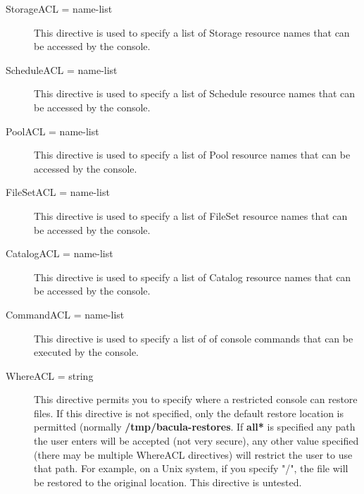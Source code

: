 \begin{description}
\item [StorageACL = \lt{}name-list\gt{}]
   This directive is used to  specify a list of Storage resource names that can
be accessed by  the console.  

\item [ScheduleACL = \lt{}name-list\gt{}]
   This directive is used to  specify a list of Schedule resource names that can
   be accessed by the console.

\item [PoolACL = \lt{}name-list\gt{}]
   This directive is used to  specify a list of Pool resource names that can be
   accessed by the console.

\item [FileSetACL = \lt{}name-list\gt{}]
   This directive is used to specify a list of FileSet resource names that
   can be accessed by the console.

\item [CatalogACL = \lt{}name-list\gt{}]
   This directive is used to specify a list of Catalog resource names that
   can be accessed by the console.

\item [CommandACL = \lt{}name-list\gt{}]
   This directive is used to specify a list of of console commands that can
   be executed by the console.

\item [WhereACL = \lt{}string\gt{}]
   This directive permits you to specify where a restricted console
   can restore files. If this directive is not specified, only the
   default restore location is permitted (normally {\bf
   /tmp/bacula-restores}. If {\bf *all*} is specified any path the
   user enters will be accepted (not very secure), any other
   value specified (there may be multiple WhereACL directives) will
   restrict the user to use that path. For example, on a Unix system,
   if you specify "/", the file will be restored to the original 
   location.  This directive is untested.

\end{description}

